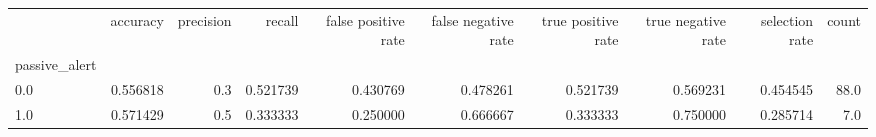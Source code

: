 \begin{tabular}{lrrrrrrrrr}
\toprule
{} &  accuracy &  precision &    recall &  false positive rate &  false negative rate &  true positive rate &  true negative rate &  selection rate &  count \\
passive\_alert &           &            &           &                      &                      &                     &                     &                 &        \\
\midrule
0.0           &  0.556818 &        0.3 &  0.521739 &             0.430769 &             0.478261 &            0.521739 &            0.569231 &        0.454545 &   88.0 \\
1.0           &  0.571429 &        0.5 &  0.333333 &             0.250000 &             0.666667 &            0.333333 &            0.750000 &        0.285714 &    7.0 \\
\bottomrule
\end{tabular}
